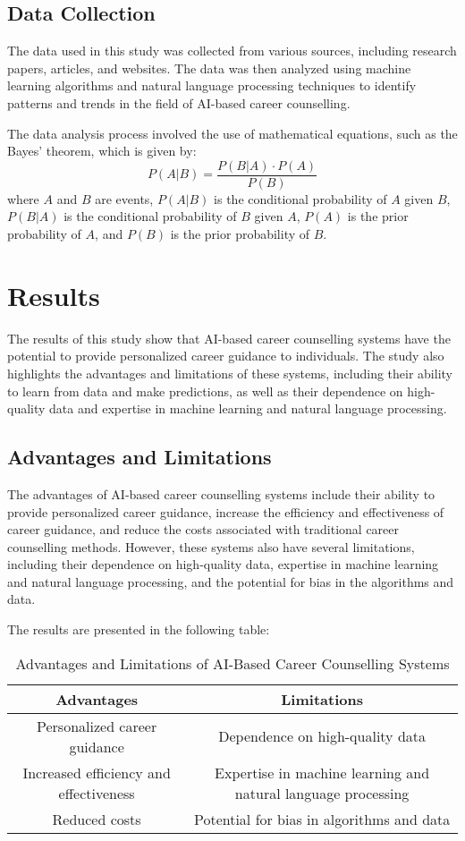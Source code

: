 \documentclass[12pt,a4paper]{article}
\begin{document}
\subsection{Data Collection}
The data used in this study was collected from various sources, including research papers, articles, and websites. The data was then analyzed using machine learning algorithms and natural language processing techniques to identify patterns and trends in the field of AI-based career counselling.

The data analysis process involved the use of mathematical equations, such as the Bayes' theorem, which is given by:
\[ P(A|B) = \frac{P(B|A) \cdot P(A)}{P(B)} \]
where $A$ and $B$ are events, $P(A|B)$ is the conditional probability of $A$ given $B$, $P(B|A)$ is the conditional probability of $B$ given $A$, $P(A)$ is the prior probability of $A$, and $P(B)$ is the prior probability of $B$.

\section{Results}
The results of this study show that AI-based career counselling systems have the potential to provide personalized career guidance to individuals. The study also highlights the advantages and limitations of these systems, including their ability to learn from data and make predictions, as well as their dependence on high-quality data and expertise in machine learning and natural language processing.

\subsection{Advantages and Limitations}
The advantages of AI-based career counselling systems include their ability to provide personalized career guidance, increase the efficiency and effectiveness of career guidance, and reduce the costs associated with traditional career counselling methods. However, these systems also have several limitations, including their dependence on high-quality data, expertise in machine learning and natural language processing, and the potential for bias in the algorithms and data.

The results are presented in the following table:
\begin{table}[h]
\centering
\caption{Advantages and Limitations of AI-Based Career Counselling Systems}
\begin{tabular}{|c|c|}
\hline
\textbf{Advantages} & \textbf{Limitations} \\
\hline
Personalized career guidance & Dependence on high-quality data \\
Increased efficiency and effectiveness & Expertise in machine learning and natural language processing \\
Reduced costs & Potential for bias in algorithms and data \\
\hline
\end{tabular}
\end{table}
\end{document}
